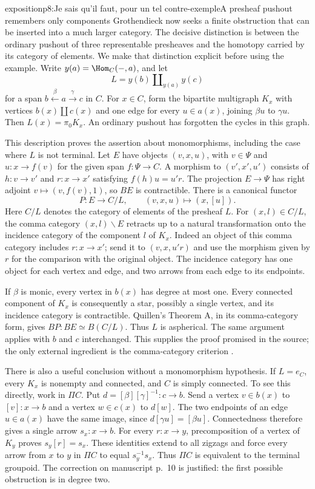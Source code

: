 \begin{dcomment}{exposition}{p8:Je sais qu'il faut, pour un tel contre-exemple}{A presheaf pushout remembers only components}
Grothendieck now seeks a finite obstruction that can be inserted into a much larger category. The decisive distinction is between the ordinary pushout of three representable presheaves and the homotopy carried by its category of elements. We make that distinction explicit before using the example. Write $y(a)=\Hom_C(-,a)$, and let
\[
 L=y(b)\amalg_{y(a)}y(c)
\]
for a span $b\xleftarrow{\beta}a\xrightarrow{\gamma}c$ in $C$. For $x\in C$, form the bipartite multigraph $K_x$ with vertices $b(x)\amalg c(x)$ and one edge for every $u\in a(x)$, joining $\beta u$ to $\gamma u$. Then $L(x)=\pi_0K_x$. An ordinary pushout has forgotten the cycles in this graph.

This description proves the assertion about monomorphisms, including the case where $L$ is not terminal. Let $E$ have objects $(v,x,u)$, with $v\in\Psi$ and $u:x\to f(v)$ for the given span $f:\Psi\to C$. A morphism to $(v',x',u')$ consists of $h:v\to v'$ and $r:x\to x'$ satisfying $f(h)u=u'r$. The projection $E\to\Psi$ has right adjoint $v\mapsto(v,f(v),1)$, so $BE$ is contractible. There is a canonical functor
\[
 P:E\longrightarrow C/L,\qquad (v,x,u)\longmapsto(x,[u]).
\]
Here $C/L$ denotes the category of elements of the presheaf $L$. For $(x,l)\in C/L$, the comma category $(x,l)\backslash E$ retracts up to a natural transformation onto the incidence category of the component $l$ of $K_x$. Indeed an object of this comma category includes $r:x\to x'$; send it to $(v,x,u'r)$ and use the morphism given by $r$ for the comparison with the original object. The incidence category has one object for each vertex and edge, and two arrows from each edge to its endpoints.

If $\beta$ is monic, every vertex in $b(x)$ has degree at most one. Every connected component of $K_x$ is consequently a star, possibly a single vertex, and its incidence category is contractible. Quillen's Theorem A, in its comma-category form, gives $BP:BE\simeq B(C/L)$. Thus $L$ is aspherical. The same argument applies with $b$ and $c$ interchanged. This supplies the proof promised in the source; the only external ingredient is the comma-category criterion \citep[\S1, Theorem A]{Quillen1973}.

There is also a useful conclusion without a monomorphism hypothesis. If $L=e_C$, every $K_x$ is nonempty and connected, and $C$ is simply connected. To see this directly, work in $\Pi C$. Put $d=[\beta][\gamma]^{-1}:c\to b$. Send a vertex $v\in b(x)$ to $[v]:x\to b$ and a vertex $w\in c(x)$ to $d[w]$. The two endpoints of an edge $u\in a(x)$ have the same image, since $d[\gamma u]=[\beta u]$. Connectedness therefore gives a single arrow $s_x:x\to b$. For every $r:x\to y$, precomposition of a vertex of $K_y$ proves $s_y[r]=s_x$. These identities extend to all zigzags and force every arrow from $x$ to $y$ in $\Pi C$ to equal $s_y^{-1}s_x$. Thus $\Pi C$ is equivalent to the terminal groupoid. The correction on manuscript p.~10 is justified: the first possible obstruction is in degree two.
\end{dcomment}

